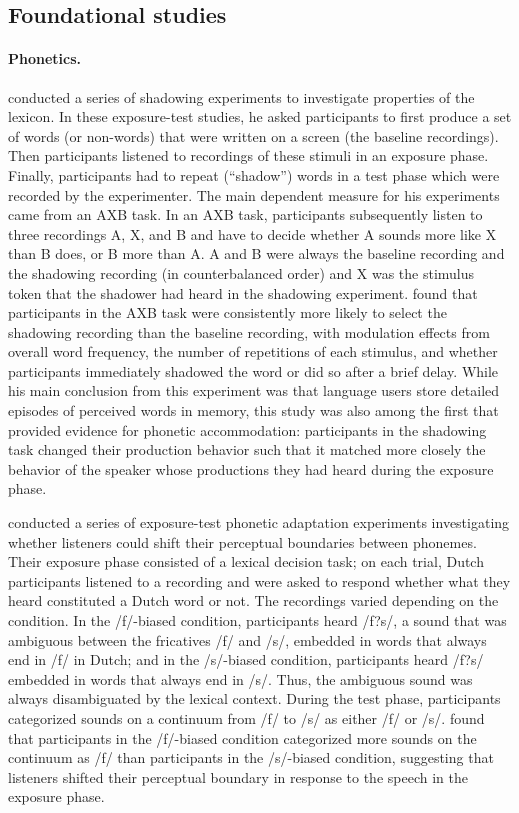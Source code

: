 \subsection{Foundational studies}

\paragraph{Phonetics.} \textcite{Goldinger1998} conducted a series of shadowing experiments to investigate properties of the lexicon. In these exposure-test studies, 
he asked participants to first produce a set of words (or non-words) that were written on a screen (the baseline recordings). Then participants listened to recordings of these stimuli in 
an exposure phase. Finally, participants had to repeat (``shadow'') words in a test phase which were recorded by the experimenter. The main dependent measure
for his experiments came from an AXB task. In an AXB task, participants subsequently listen to three recordings A, X, and B and have to decide whether A sounds more like X
than B does, or B more than A. A and B were always the baseline recording and the shadowing recording (in counterbalanced order) and X was the stimulus token that the shadower had heard
in the shadowing experiment. \textcite{Goldinger1998} found that participants in the AXB task  were consistently more likely to select the shadowing recording than the baseline recording, with modulation
effects from overall word frequency, the number of repetitions of each stimulus, and whether participants immediately shadowed the word or did so after a brief delay. While his main conclusion
from this experiment was that language users store detailed episodes of perceived words in memory, this study was also among the first that provided evidence for phonetic accommodation: 
participants in the shadowing task changed their production behavior such that it matched more closely the behavior of the speaker whose productions they had heard during the exposure phase.

\textcite{Norris2003} conducted a series of exposure-test phonetic adaptation
experiments investigating whether listeners could shift their perceptual boundaries between phonemes. Their exposure phase
consisted of a lexical decision task; on each trial, Dutch participants listened to a recording and were asked to respond whether
what they heard constituted a Dutch word or not. The recordings varied depending on the condition. In the /f/-biased condition,
participants heard /f?s/, a sound that was ambiguous between the fricatives /f/ and /s/, embedded in words that always end in /f/
in Dutch; and in the /s/-biased condition, participants heard /f?s/ embedded in words that always end in /s/. Thus, the ambiguous sound was always 
disambiguated by the lexical context. During the test phase, participants categorized sounds on a continuum from /f/ to /s/ as either /f/ or /s/. \textcite{Norris2003}
found that participants in the /f/-biased condition categorized more sounds on the continuum as /f/ than participants in the /s/-biased condition,
suggesting that listeners shifted their perceptual boundary in response to the speech in the exposure phase.
 
